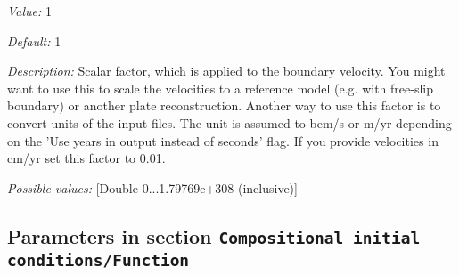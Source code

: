 \begin{itemize}
{\it Value:} 1


{\it Default:} 1


{\it Description:} Scalar factor, which is applied to the boundary velocity. You might want to use this to scale the velocities to a reference model (e.g. with free-slip boundary) or another plate reconstruction. Another way to use this factor is to convert units of the input files. The unit is assumed to bem/s or m/yr depending on the 'Use years in output instead of seconds' flag. If you provide velocities in cm/yr set this factor to 0.01.


{\it Possible values:} [Double 0...1.79769e+308 (inclusive)]
\end{itemize}

\subsection{Parameters in section \tt Compositional initial conditions/Function}
\label{parameters:Compositional_20initial_20conditions/Function}

